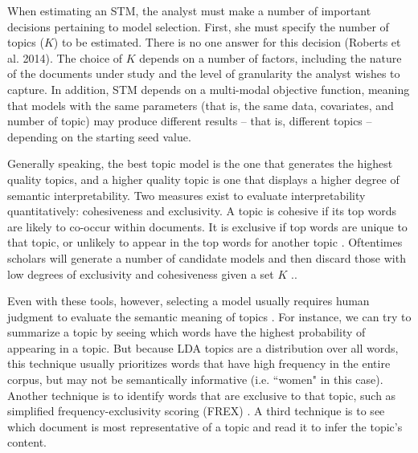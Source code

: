 \documentclass[11pt, oneside]{article}
\begin{document}
When estimating an STM, the analyst must make a number of important decisions pertaining to model selection. First, she must specify the number of topics ($K$) to be estimated. There is no one answer for this decision (Roberts et al. 2014). The choice of $K$ depends on a number of factors, including the nature of the documents under study and the level of granularity the analyst wishes to capture. In addition, STM depends on a multi-modal objective function, meaning that models with the same parameters (that is, the same data, covariates, and number of topic) may produce different results -- that is, different topics -- depending on the starting seed value.

Generally speaking, the best topic model is the one that generates the highest quality topics, and a higher quality topic is one that displays a higher degree of semantic interpretability. Two measures exist to evaluate interpretability quantitatively: cohesiveness and exclusivity. A topic is cohesive if its top words are likely to co-occur within documents. It is exclusive if top words are unique to that topic, or unlikely to appear in the top words for another topic \cite[p.~6]{roberts2014}. Oftentimes scholars will generate a number of candidate models and then discard those with low degrees of exclusivity and cohesiveness given a set $K$ \cite{roberts2014}..

Even with these tools, however, selecting a model usually requires human judgment to evaluate the semantic meaning of topics \cite{mohr2013}. For instance, we can try to summarize a topic by seeing which words have the highest probability of appearing in a topic. But because LDA topics are a distribution over all words, this technique usually prioritizes words that have high frequency in the entire corpus, but may not be semantically informative (i.e. ``women" in this case). Another technique is to identify words that are exclusive to that topic, such as simplified frequency-exclusivity scoring (FREX) \cite[p. 5]{lucas2015computer}. A third technique is to see which document is most representative of a topic and read it to infer the topic's content.
\end{document}
